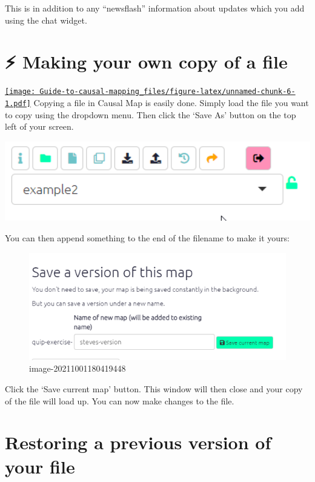 \documentclass[
]{book}
\begin{document}
This is in addition to any ``newsflash'' information about updates which you add using the chat widget.

\hypertarget{xown-copy}{%
\section{⚡ Making your own copy of a file}\label{xown-copy}}

\href{https://player.vimeo.com/video/641927229}{\texttt{[image: Guide-to-causal-mapping\_files/figure-latex/unnamed-chunk-6-1.pdf]}}
Copying a file in Causal Map is easily done. Simply load the file you want to copy using the dropdown menu. Then click the `Save As' button on the top left of your screen.

\includegraphics[width=6.77083in,height=\textheight]{_assets/5Najfi4Pr2.gif}

You can then append something to the end of the filename to make it yours:

\begin{figure}
\centering
\includegraphics[width=6.77083in,height=\textheight]{_assets/image-20211001180419448.png}
\caption{image-20211001180419448}
\end{figure}

Click the `Save current map' button. This window will then close and your copy of the file will load up. You can now make changes to the file.

\hypertarget{restoring-a-previous-version-of-your-file}{%
\section{Restoring a previous version of your file}\label{restoring-a-previous-version-of-your-file}}
\end{document}
